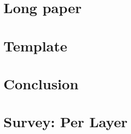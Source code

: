 \documentclass[conference]{IEEEtran}
\begin{document}
\begin{refsection}
\chapter[5:''I can’t remember the last day I didn’t train'' - Michael Phelps]{Long paper}
	
	
	
	
	
	
	
	
\chapter[6:''la patience fait fondre le marbre'' -- Amer]{Template}
	
	
	
	
	
	
	
% 	
% 	
% 	
% 	
% 	
% 	
% 	
% 	
\chapter[1:''Everything that has a beginning has an ending. Make your peace with that and all will be well'' - Jack Kornfield]{Conclusion}
	
\Appendix
\chapter[B:''Dans tout conflit, découvrez celui qui se frotte les mains ... Vous verrez que ce n'est jamais celui qui se bagarre !''  - Marc Roussel]{Survey: Per Layer}
	
	
	
	
	
% 	
% 	
% 	
% 	
% 	
% 	
% 	
% 	
% 	
% 	
% 	
% 	
% 	
% 	
% 	
% 	

\end{refsection}
\end{document}
